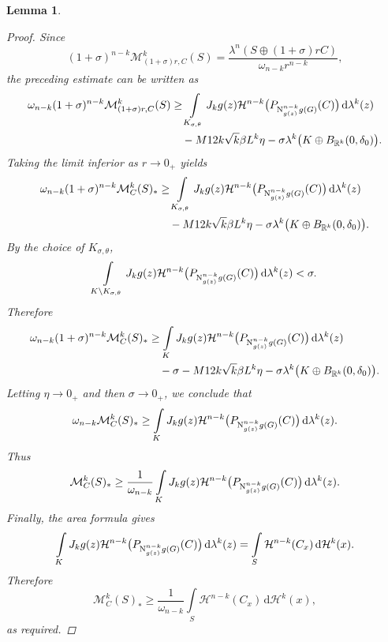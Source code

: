 \documentclass[pdflatex,sn-mathphys-num]{sn-jnl}
\theoremstyle{plain}
\newtheorem{lemma}[theorem]{Lemma}
\theoremstyle{definition}
\newcommand{\dH}[1]{\,\mathrm d\mathcal{H}^{#1}}
\newcommand{\dlambda}[1]{\,\mathrm d\lambda^{#1}}
\begin{document}
\begin{lemma}
\begin{proof}
Since
\[
(1+\sigma)^{n-k}\mathcal M^k_{(1+\sigma)r,C}(S)
=
\frac{\lambda^n(S\oplus(1+\sigma)rC)}
{\omega_{n-k}r^{n-k}},
\]
the preceding estimate can be written as
\[
\begin{split}
\omega_{n-k}(1+\sigma)^{n-k}
\mathcal M^k_{(1+\sigma)r,C}(S)
&\geq
\int\limits_{K_{\sigma,\theta}}
J_kg(z)\mathcal H^{n-k}
\big(P_{\textup{N}^{n-k}_{g(z)}g(G)}(C)\big)\dlambda{k}(z)
\\
&\quad-
M 12k\sqrt{k}\beta L^k\eta
-
\sigma\lambda^k\big(K\oplus B_{\mathbb{R}^k}(0, \delta_0)\big).
\end{split}
\]
Taking the limit inferior as \(r\to0_+\) yields
\[
\begin{split}
\omega_{n-k}(1+\sigma)^{n-k}
\mathcal M^k_C(S)_*
&\geq
\int\limits_{K_{\sigma,\theta}}
J_kg(z)\mathcal H^{n-k}
\big(P_{\textup{N}^{n-k}_{g(z)}g(G)}(C)\big)\dlambda{k}(z)
\\
&\quad-
M 12k\sqrt{k}\beta L^k\eta
-
\sigma\lambda^k\big(K\oplus B_{\mathbb{R}^k}(0, \delta_0)\big).
\end{split}
\]
By the choice of \(K_{\sigma,\theta}\),
\[
\int\limits_{K\setminus K_{\sigma,\theta}}
J_kg(z)\mathcal H^{n-k}
\big(P_{\textup{N}^{n-k}_{g(z)}g(G)}(C)\big)\dlambda{k}(z)
<\sigma.
\]
Therefore
\[
\begin{split}
\omega_{n-k}(1+\sigma)^{n-k}
\mathcal M^k_C(S)_*
&\geq
\int\limits_K
J_kg(z)\mathcal H^{n-k}
\big(P_{\textup{N}^{n-k}_{g(z)}g(G)}(C)\big)\dlambda{k}(z)
\\
&\quad-
\sigma
-
M 12k\sqrt{k}\beta L^k\eta
-
\sigma\lambda^k\big(K\oplus B_{\mathbb{R}^k}(0, \delta_0)\big).
\end{split}
\]
Letting \(\eta\to0_+\) and then \(\sigma\to0_+\), we conclude that
\[
\omega_{n-k}\mathcal{M}^k_C(S)_*
\geq
\int\limits_K
J_kg(z)\mathcal{H}^{n-k}
\big(P_{\textup{N}^{n-k}_{g(z)}g(G)}(C)\big)\dlambda{k}(z).
\]
Thus
\[
\mathcal{M}^k_C(S)_*
\geq
\frac1{\omega_{n-k}}
\int\limits_K
J_kg(z)\mathcal H^{n-k}
\big(P_{\textup{N}^{n-k}_{g(z)}g(G)}(C)\big)\dlambda{k}(z).
\]
Finally, the area formula gives
\[
\int\limits_K
J_kg(z)\mathcal{H}^{n-k}
\big(P_{\textup{N}^{n-k}_{g(z)}g(G)}(C)\big)\dlambda{k}(z)
=
\int\limits_S\mathcal{H}^{n-k}(C_x)\dH{k}(x).
\]
Therefore
\[
\mathcal{M}^k_C(S)_*
\geq
\frac1{\omega_{n-k}}
\int\limits_S\mathcal{H}^{n-k}(C_x)\dH{k}(x),
\]
as required.
\end{proof}
\end{lemma}
\end{document}

